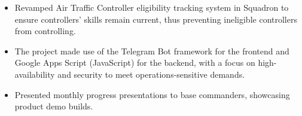 \begin{itemize}
\item Revamped Air Traffic Controller eligibility tracking system in Squadron to ensure controllers’ skills remain current, thus preventing ineligible controllers from controlling. 
\item The project made use of the Telegram Bot framework for the frontend and Google Apps Script (JavaScript) for the backend, with a focus on high-availability and security to meet operations-sensitive demands.
\item Presented monthly progress presentations to base commanders, showcasing product demo builds.
\end{itemize}